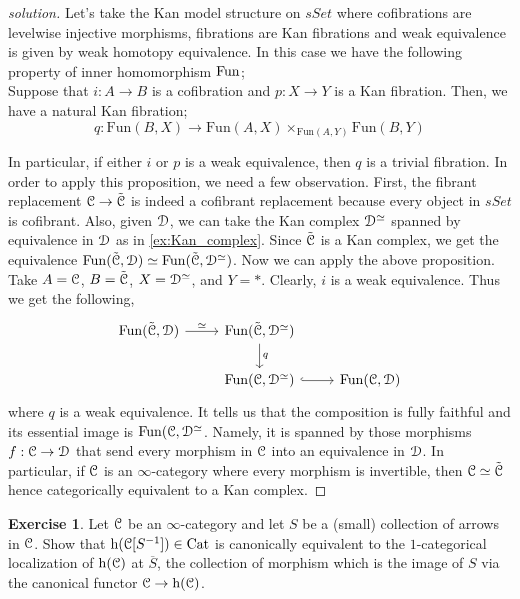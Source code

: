 \documentclass[10pt,a4paper,reqno,oneside]{book} %
\theoremstyle{plain}
\theoremstyle{definition}
\newtheorem{exercise}[thm]{Exercise}
\theoremstyle{remark}
\numberwithin{equation}{section}
\begin{document}
\ifpersonal
\begin{proof}[solution]
    Let's take the Kan model structure on $sSet$ where cofibrations are levelwise injective morphisms, fibrations are Kan fibrations and weak equivalence is given by weak homotopy equivalence. In this case we have the following property of inner homomorphism $\operatorname{Fun}$;\\
    Suppose that $i \colon A \to B$ is a  cofibration and $p \colon X \to Y$ is a Kan fibration. Then, we have a natural Kan fibration;
    \[ q \colon \mathrm{Fun}(B,X) \to 
    \mathrm{Fun}(A,X) \times_{\mathrm{Fun}(A,Y)} \mathrm{Fun}(B,Y) \]
  
    In particular, if either $i$ or $p$ is a weak equivalence, then $q$ is a trivial fibration.
    In order to apply this proposition, we need a few observation. First, the fibrant replacement $\mathcal C \to \tilde{\mathcal C}$ is indeed a cofibrant replacement because every object in $sSet$ is cofibrant. Also, given $\mathcal D$, we can take the Kan complex $\mathcal D^{\simeq}$ spanned by equivalence in $\mathcal D$ as in \ref{ex:Kan_complex}. Since $\tilde{\mathcal C}$ is a Kan complex, we get the equivalence $\operatorname{Fun}(\tilde{\mathcal C}, \mathcal D) \simeq \operatorname{Fun}(\tilde{\mathcal C}, \mathcal D^{\simeq})$. Now we can apply the above proposition. Take $A=\mathcal C$, $B=\tilde{\mathcal C}$, $X=\mathcal D^{\simeq}$, and $Y=*$. Clearly, $i$ is a weak equivalence. Thus we get the following,
    \[ \begin{tikzcd}
		\Fun(\tilde{\cC},\cD) \arrow{r}{\simeq} & \Fun(\tilde{\cC},\cD^{\simeq}) \arrow{d}{q} & {} \\
		{} & \Fun(\cC, \cD^{\simeq}) \arrow[hook]{r} & \Fun(\cC, \cD) 
	\end{tikzcd} \]
	where $q$ is a weak equivalence. It tells us that the composition is fully faithful and its essential image is $\operatorname{Fun}(\mathcal C, \mathcal D^{\simeq}$. Namely, it is spanned by those morphisms $f:\mathcal C \to \mathcal D$ that send every morphism in $\mathcal C$ into an equivalence in $\mathcal D$. In particular, if $\mathcal C$ is an $\infty$-category where every morphism is invertible, then $\mathcal C \simeq \tilde{\mathcal C}$ hence categorically equivalent to a Kan complex.
\end{proof}
\fi

\begin{exercise}
	Let $\mathcal C$ be an $\infty$-category and let $S$ be a (small) collection of arrows in $\mathcal C$.
	Show that $\mathrm h(\mathcal C[S^{-1}]) \in \mathrm{Cat}$ is canonically equivalent to the $1$-categorical localization of $\mathrm h(\mathcal C)$ at $\overline{S}$, the collection of morphism which is the image of $S$ via the canonical functor $\mathcal C \to \mathrm h(\mathcal C)$.
\end{exercise}
\end{document}
